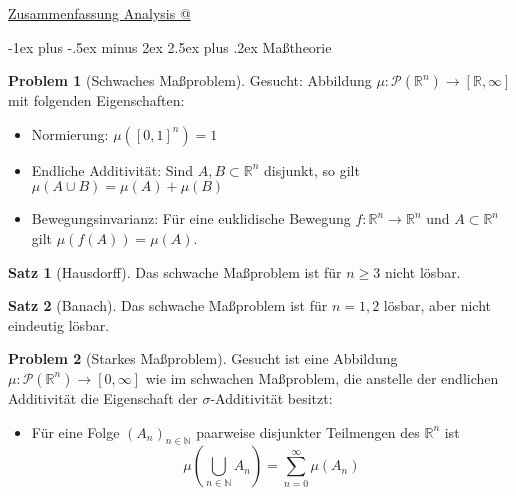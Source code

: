 \documentclass[a4paper,10pt,landscape]{article}
\makeatletter
\newcommand{\R}{\mathbb{R}}
\newcommand{\N}{\mathbb{N}}
\newcommand{\PS}{\mathcal{P}} %
\theoremstyle{definition}
\newtheorem*{prob}{Problem}
\newtheorem*{satz}{Satz}
\theoremstyle{remark}
\newcommand*{\rom}[1]{\expandafter\@slowromancap\romannumeral #1@}
\renewcommand{\section}{\@startsection{section}{1}{0mm}%
                                {-1ex plus -.5ex minus 2ex}%
                                {2.5ex plus .2ex}%
                                {\normalfont\large\bfseries}}
\makeatother
\begin{document}
\raggedright
\footnotesize
\begin{multicols}{3}

\setlength{\premulticols}{1pt}
\setlength{\postmulticols}{1pt}
\setlength{\multicolsep}{1pt}
\setlength{\columnsep}{2pt}

\begin{center}
  \Large{\underline{Zusammenfassung Analysis \rom{3}}} \\
\end{center}

\section{Maßtheorie}

\begin{prob}[Schwaches Maßproblem]
  Gesucht: Abbildung $\mu : \PS(\R^n) \to [\R, \infty]$ mit folgenden Eigenschaften:
  \begin{itemize}
    \item Normierung: $\mu([0, 1]^n) = 1$
    \item Endliche Additivität: Sind $A, B \subset \R^n$ disjunkt, so gilt $\mu(A \cup B) = \mu(A) + \mu(B)$
    \item Bewegungsinvarianz: Für eine euklidische Bewegung $f : \R^n \to \R^n$ und $A \subset \R^n$ gilt $\mu(f(A)) = \mu(A)$.
  \end{itemize}
\end{prob}

\begin{satz}[Hausdorff]
  Das schwache Maßproblem ist für $n \geq 3$ nicht lösbar.
\end{satz}

\begin{satz}[Banach]
  Das schwache Maßproblem ist für $n = 1, 2$ lösbar, aber nicht eindeutig lösbar.
\end{satz}

\begin{prob}[Starkes Maßproblem]
  Gesucht ist eine Abbildung $\mu : \PS(\R^n) \to [0, \infty]$ wie im schwachen Maßproblem, die anstelle der endlichen Additivität die Eigenschaft der $\sigma$-Additivität besitzt:
  \begin{itemize}
    \item Für eine Folge $(A_n)_{n \in \N}$ paarweise disjunkter Teilmengen des $\R^n$ ist
      \[ \mu\left(\bigcup_{n \in \N} A_n\right) = \sum_{n=0}^\infty \mu(A_n) \]
  \end{itemize}
\end{prob}


\end{multicols}
\end{document}
